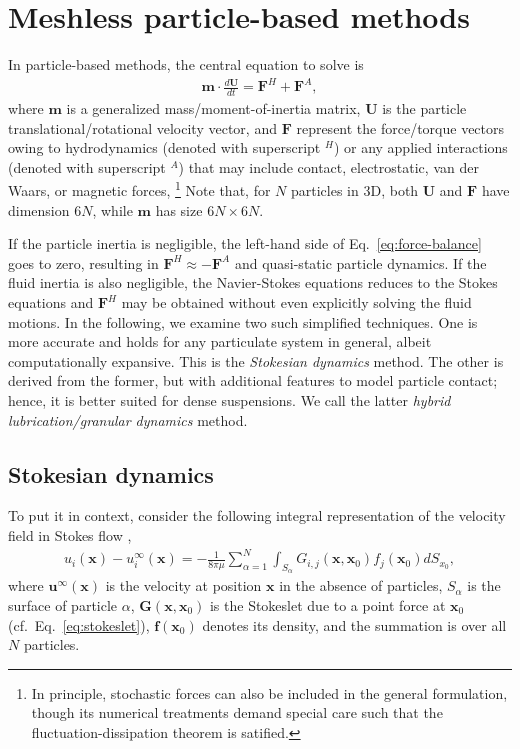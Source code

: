 \section{Meshless particle-based methods}
\label{sec:num-dem}

In particle-based methods, the central equation to solve is
\begin{equation} 
 \begin{aligned} \label{eq:force-balance}
  {\bm m} \cdot \frac{d{\bm U}}{dt} = {\bm F}^H + {\bm F}^A, 
 \end{aligned}
\end{equation}
where ${\bm m}$ is a generalized mass/moment-of-inertia matrix,
${\bm U}$ is the particle translational/rotational velocity vector,
and ${\bm F}$ represent the force/torque vectors owing to hydrodynamics (denoted with superscript $^H$) or any applied interactions (denoted with superscript $^A$) that may include contact, electrostatic, van der Waars, or magnetic forces, \etc \footnote{In principle, stochastic forces can also be included in the general formulation, though its numerical treatments demand special care such that the fluctuation-dissipation theorem is satified.}
Note that, for $N$ particles in 3D, both ${\bm U}$ and ${\bm F}$ have dimension $6N$, while ${\bm m}$ has size $6N \times 6N$.

If the particle inertia is negligible, the left-hand side of Eq.\ \eqref{eq:force-balance} goes to zero, resulting in $\bm{F}^H \approx -\bm{F}^A$ and quasi-static particle dynamics.
If the fluid inertia is also negligible, the Navier-Stokes equations reduces to the Stokes equations and $\bm{F}^H$ may be obtained without even explicitly solving the fluid motions.
In the following, we examine two such simplified techniques.
One is more accurate and holds for any particulate system in general, albeit computationally expansive. This is the \emph{Stokesian dynamics} method.
The other is derived from the former, but with additional features to model particle contact; hence, it is better suited for dense suspensions. We call the latter \emph{hybrid lubrication/granular dynamics} method.

\subsection{Stokesian dynamics}
\label{subsec:sd}

To put it in context, consider the following integral representation of the velocity field in Stokes flow \citep{Ladyzhenskaya},
\begin{equation} \label{eq:boundary-integral}
 \begin{aligned}
  u_i(\bm{x}) - u_i^\infty(\bm{x}) = -\frac{1}{8\pi \mu} \sum_{\alpha=1}^N  \int_{S_\alpha} G_{i,j} (\bm{x},\bm{x}_0) f_j(\bm{x}_0) dS_{x_0},
 \end{aligned}
\end{equation}
where $\bm{u}^\infty(\bm{x})$ is the velocity at position $\bm{x}$ in the absence of particles,
$S_\alpha$ is the surface of particle $\alpha$,
$\bm{G}(\bm{x},\bm{x}_0)$ is the Stokeslet due to a point force at $\bm{x}_0$ (cf.\ Eq.\ \ref{eq:stokeslet}),
$\bm f(\bm{x}_0)$ denotes its density,
and the summation is over all $N$ particles.

